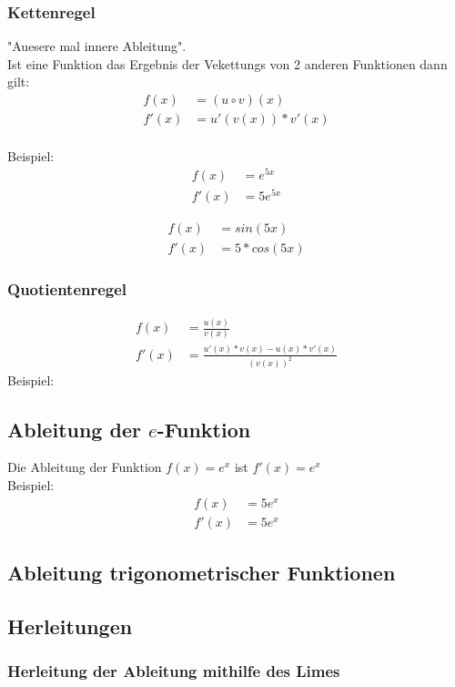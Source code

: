 \documentclass[a4paper]{article} %
\begin{document}
	\subsubsection{Kettenregel}
	"Auesere mal innere Ableitung".\\
	Ist eine Funktion das Ergebnis der Vekettungs von 2 anderen Funktionen dann gilt:\\
	 \begin{align*}
		f(x)&=(u \circ v)(x)\\
		f'(x)&=u'(v(x))*v'(x)
	\end{align*}
	\\Beispiel:\\
		\begin{align*}
		f(x) &=e^{5x}\\
		f'(x)&=5e^{5x}
		\end{align*}

		\begin{align*}
		f(x)&=sin(5x)\\
		f'(x)&=5*cos(5x)
		\end{align*}

	\subsubsection{Quotientenregel}
		\begin{align*}
		f(x)&=\frac{u(x)}{v(x)}\\
		f'(x)&=\frac{u'(x)*v(x)-u(x)*v'(x)}{(v(x))^2}
		\end{align*}
		Beispiel: \\ 
	
	\subsection{Ableitung der $e$-Funktion}
	Die Ableitung der Funktion $f(x)=e^x$ ist $f'(x)=e^x$
	\\Beispiel:\\
	\begin{align*}
		f(x)&=5e^x\\
		f'(x)&=5e^x
	\end{align*}
	\subsection{Ableitung trigonometrischer Funktionen}
	\subsection{Herleitungen}
	\subsubsection{Herleitung der Ableitung mithilfe des Limes}
\end{document}
